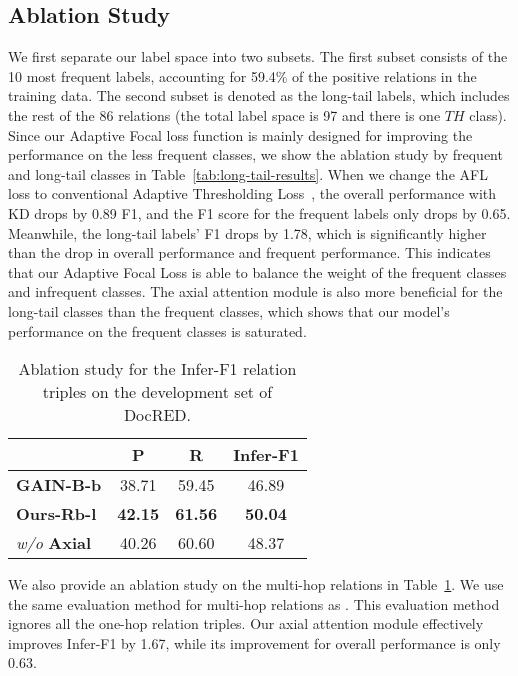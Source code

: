 \documentclass[11pt]{article}
\begin{document}
\subsection{Ablation Study}
We first separate our label space into two subsets. The first subset consists of the 10 most frequent labels, accounting for 59.4\% of the positive relations in the training data. The second subset is denoted as the long-tail labels, which includes the rest of the 86 relations (the total label space is 97 and there is one $TH$ class). Since our Adaptive Focal loss function is mainly designed for improving the performance on the less frequent classes, we show the ablation study by frequent and long-tail classes in Table~\ref{tab:long-tail-results}. When we change the AFL loss to conventional Adaptive Thresholding Loss~\citep{zhou2021document}, the overall performance with KD drops by 0.89 F1, and the F1 score for the frequent labels only drops by 0.65. Meanwhile, the long-tail labels' F1 drops by 1.78, which is significantly higher than the drop in overall performance and frequent performance. This indicates that our Adaptive Focal Loss is able to balance the weight of the frequent classes and infrequent classes. The axial attention module is also more beneficial for the long-tail classes than the frequent classes, which shows that our model's performance on the frequent classes is saturated.

\begin{table}[ht]
\centering

\begin{tabular}{lccc} 
\hline
~                 & P     & R     & Infer-F1  \\ 
\hline
\textbf{GAIN-B-b}           & 38.71 & 59.45 & 46.89           \\
\textbf{Ours-Rb-l} & \textbf{42.15} & \textbf{61.56} & \textbf{50.04}           \\
 \textit{w/o} \textbf{Axial}    & 40.26 & 60.60  & 48.37           \\
\hline
\end{tabular}

\caption{Ablation study for the Infer-F1 relation triples on the development set of DocRED.}
\label{tab:infer-result}

\end{table}

We also provide an ablation study on the multi-hop relations in Table~\ref{tab:infer-result}. We use the same evaluation method for multi-hop relations as \citet{zeng2020double}. This evaluation method ignores all the one-hop relation triples. Our axial attention module effectively improves Infer-F1 by 1.67, while its improvement for overall performance is only 0.63. 
\end{document}
